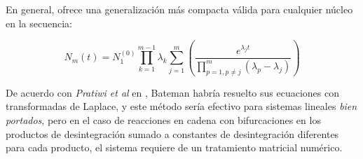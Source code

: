 En general, \cite{Loch.2013} ofrece una generalización más compacta válida para cualquier núcleo en la secuencia:

\begin{equation}
        N_m(t)=N_1^{(0)} \prod_{k=1}^{m-1}\lambda_k\sum_{j=1}^{m}\left(\frac{e^{\lambda_j t}}{\prod\limits_{p=1, p\neq j}^{m}\left(\lambda_p-\lambda_j\right)}\right) \label{batemangeneral}
\end{equation}

De acuerdo con \textit{Pratiwi et al} en \cite{Pratiwi.2021}, Bateman habría resuelto sus ecuaciones con transformadas de Laplace, y este método sería efectivo para sistemas lineales \textit{bien portados}, pero en el caso de reacciones en cadena con bifurcaciones en los productos de desintegración sumado a constantes de desintegración diferentes para cada producto, el sistema requiere de un tratamiento matricial numérico. 